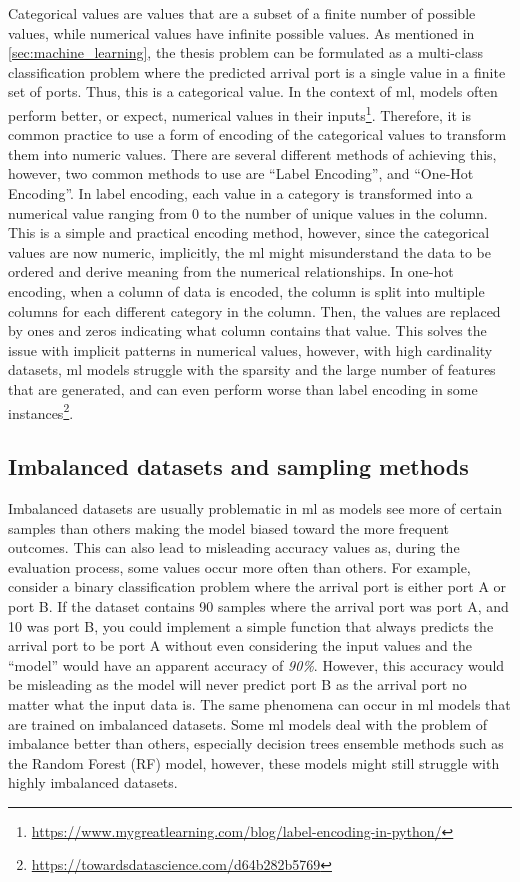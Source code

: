 Categorical values are values that are a subset of a finite number of possible values, while numerical values have infinite possible values. As mentioned in \cref{sec:machine_learning}, the thesis problem can be formulated as a multi-class classification problem where the predicted arrival port is a single value in a finite set of ports. Thus, this is a categorical value. In the context of \acrshort{ml}, models often perform better, or expect, numerical values in their inputs\footnote{\url{https://www.mygreatlearning.com/blog/label-encoding-in-python/}}. Therefore, it is common practice to use a form of encoding of the categorical values to transform them into numeric values. There are several different methods of achieving this, however, two common methods to use are ``Label Encoding'', and ``One-Hot Encoding''. In label encoding, each value in a category is transformed into a numerical value ranging from 0 to the number of unique values in the column. This is a simple and practical encoding method, however, since the categorical values are now numeric, implicitly, the \acrshort{ml} might misunderstand the data to be ordered and derive meaning from the numerical relationships. In one-hot encoding, when a column of data is encoded, the column is split into multiple columns for each different category in the column. Then, the values are replaced by ones and zeros indicating what column contains that value. This solves the issue with implicit patterns in numerical values, however, with high cardinality datasets, \acrshort{ml} models struggle with the sparsity and the large number of features that are generated, and can even perform worse than label encoding in some instances\footnote{\url{https://towardsdatascience.com/d64b282b5769}}.


\subsection{Imbalanced datasets and sampling methods}

Imbalanced datasets are usually problematic in \acrshort{ml} as models see more of certain samples than others making the model biased toward the more frequent outcomes. This can also lead to misleading accuracy values as, during the evaluation process, some values occur more often than others. For example, consider a binary classification problem where the arrival port is either port A or port B. If the dataset contains 90 samples where the arrival port was port A, and 10 was port B, you could implement a simple function that always predicts the arrival port to be port A without even considering the input values and the ``model'' would have an apparent accuracy of \textit{90\%}. However, this accuracy would be misleading as the model will never predict port B as the arrival port no matter what the input data is. The same phenomena can occur in \acrshort{ml} models that are trained on imbalanced datasets. Some \acrshort{ml} models deal with the problem of imbalance better than others, especially decision trees ensemble methods such as the Random Forest (RF) model, however, these models might still struggle with highly imbalanced datasets.

